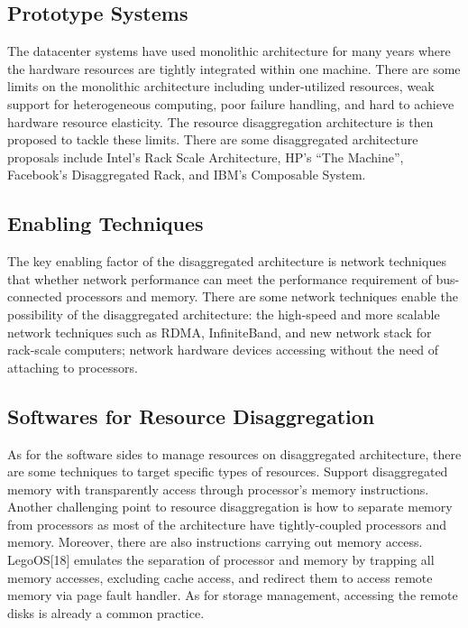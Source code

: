 \documentclass[twocolumn]{article}
\begin{document}
\subsection{Prototype Systems}
The datacenter systems have used monolithic architecture for many years where the hardware resources are tightly integrated within one machine. There are some limits on the monolithic architecture including under-utilized resources, weak support for heterogeneous computing, poor failure handling, and hard to achieve hardware resource elasticity. The resource disaggregation architecture is then proposed to tackle these limits. There are some disaggregated architecture proposals include Intel’s Rack Scale Architecture\cite{Intel_RSA}, HP’s “The Machine”\cite{HP_The_Machine}, Facebook’s Disaggregated Rack\cite{FB_disaggregated_rack}, and IBM’s Composable System\cite{IBM_composable_system}. 

\subsection{Enabling Techniques}
The key enabling factor of the disaggregated architecture is network techniques that whether network performance can meet the performance requirement of bus-connected processors and memory\cite{Network_requirement}. There are some network techniques enable the possibility of the disaggregated architecture: the high-speed and more scalable network techniques such as RDMA\cite{RDMA}, InfiniteBand\cite{InfiniteBand}, and new network stack for rack-scale computers\cite{Network_stack_for_rack}; network hardware devices accessing without the need of attaching to processors\cite{NVM_performance, NVM_performance2}.

\subsection{Softwares for Resource Disaggregation}
As for the software sides to manage resources on disaggregated architecture, there are some techniques to target specific types of resources. Support disaggregated memory with transparently access through processor’s memory instructions\cite{Disaggregated_memory, Disaggregated_memory2}. Another challenging point to resource disaggregation is how to separate memory from processors as most of the architecture have tightly-coupled processors and memory. Moreover, there are also instructions carrying out memory access. LegoOS[18] emulates the separation of processor and memory by trapping all memory accesses, excluding cache access, and redirect them to access remote memory via page fault handler. As for storage management, accessing the remote disks is already a common practice\cite{VMware_virtual_SAN, Amazon_EC2_root_volume}.
\end{document}
